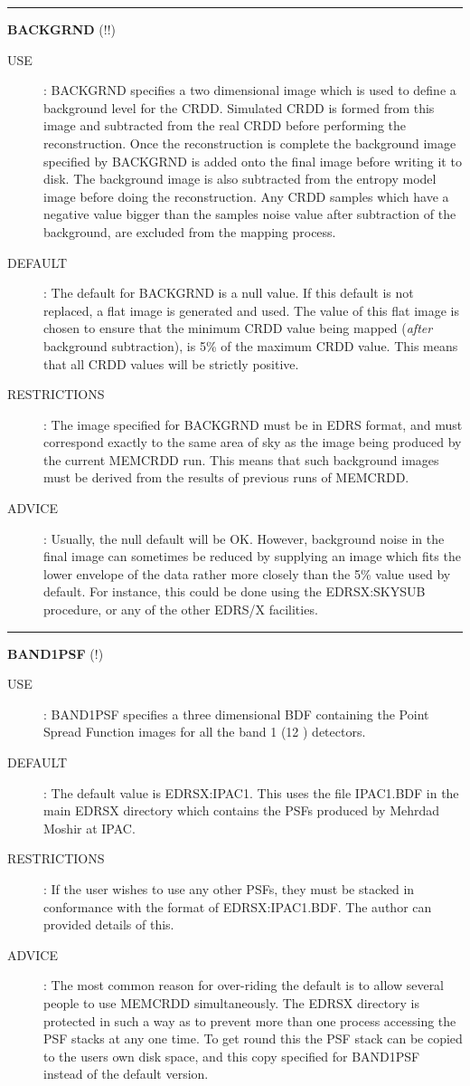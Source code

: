 \rule{\textwidth}{0.3mm}
{\Large {\bf BACKGRND} (!!)}
\begin{description}
\item [USE]:
BACKGRND specifies a two dimensional image which is used to define a background
level for the CRDD. Simulated CRDD is formed from this image and subtracted from
the real CRDD before performing the reconstruction. Once the reconstruction is
complete the background image specified by BACKGRND is added onto the final
image before writing it to disk. The background image is also subtracted from
the entropy model image before doing the reconstruction. Any CRDD samples which
have a negative value bigger than the samples noise value after
subtraction of the background, are excluded from the mapping process.
\item [DEFAULT]:
The default for BACKGRND is a null value. If this default is not replaced,
a flat image is generated and used. The value of this flat image is chosen to
ensure that the minimum CRDD value being mapped ({\em after} background
subtraction), is 5\% of the maximum CRDD value. This means that all CRDD values
will be strictly positive.
\item [RESTRICTIONS]:
The image specified for BACKGRND must be in EDRS format, and must correspond
exactly to the same area of sky as the image being produced by the current
MEMCRDD run. This means that such background images must be derived
from the results of previous runs of MEMCRDD.
\item [ADVICE]:
Usually, the null default will be OK. However, background noise in the final
image can sometimes be reduced by supplying an image which fits the lower
envelope of the data rather more closely than the 5\% value used by default.
For instance, this could be done using the EDRSX:SKYSUB procedure, or any of
the other EDRS/X facilities.
\end {description}

\rule{\textwidth}{0.3mm}
{\Large {\bf BAND1PSF} (!)}
\begin{description}
\item [USE]:
BAND1PSF specifies a three dimensional BDF containing the Point Spread Function
images for all the band 1 (12 \micron) detectors.
\item [DEFAULT]:
The default value is EDRSX:IPAC1. This uses the file IPAC1.BDF in the main
EDRSX directory which contains the PSFs produced by Mehrdad Moshir at IPAC.
\item [RESTRICTIONS]:
If the user wishes to use any other PSFs, they must be stacked in conformance
with the format of EDRSX:IPAC1.BDF. The author can provided details of this.
\item [ADVICE]:
The most common reason for over-riding the default is to allow several people
to use MEMCRDD simultaneously. The EDRSX directory is protected in such a way as
to prevent more than one process accessing the PSF stacks at any one time. To
get round this the PSF stack can be copied to the users own disk space, and this
copy specified for BAND1PSF instead of the default version.
\end {description}


